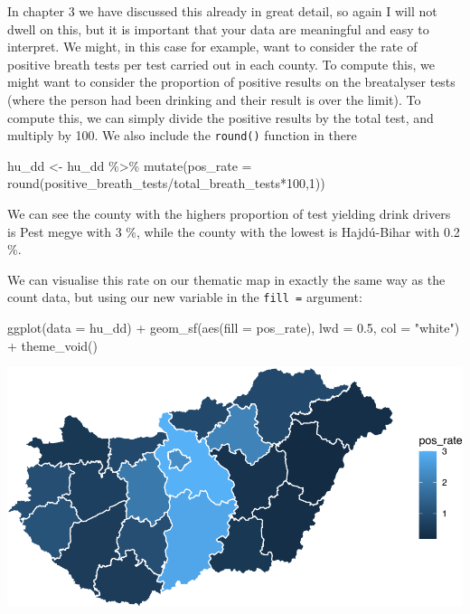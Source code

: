 \documentclass[
  krantz2]{krantz}
\makeatletter
\newenvironment{Shaded}{\begin{snugshade}}{\end{snugshade}}
\newcommand{\AttributeTok}[1]{\textcolor[rgb]{0.61,0.61,0.61}{#1}}
\newcommand{\DecValTok}[1]{\textcolor[rgb]{0.06,0.06,0.06}{#1}}
\newcommand{\FloatTok}[1]{\textcolor[rgb]{0.06,0.06,0.06}{#1}}
\newcommand{\FunctionTok}[1]{\textcolor[rgb]{0,0,0}{#1}}
\newcommand{\NormalTok}[1]{#1}
\newcommand{\OtherTok}[1]{\textcolor[rgb]{0.37,0.37,0.37}{#1}}
\newcommand{\SpecialCharTok}[1]{\textcolor[rgb]{0,0,0}{#1}}
\newcommand{\StringTok}[1]{\textcolor[rgb]{0.5,0.5,0.5}{#1}}
\newenvironment{kframe}{%
\medskip{}
\setlength{\fboxsep}{.8em}
 \def\at@end@of@kframe{}%
 \ifinner\ifhmode%
  \def\at@end@of@kframe{\end{minipage}}%
  \begin{minipage}{\columnwidth}%
 \fi\fi%
 \def\FrameCommand##1{\hskip\@totalleftmargin \hskip-\fboxsep
 \colorbox{shadecolor}{##1}\hskip-\fboxsep
     \hskip-\linewidth \hskip-\@totalleftmargin \hskip\columnwidth}%
 \MakeFramed {\advance\hsize-\width
   \@totalleftmargin\z@ \linewidth\hsize
   \@setminipage}}%
 {\par\unskip\endMakeFramed%
 \at@end@of@kframe}
\renewenvironment{Shaded}{\begin{kframe}}{\end{kframe}}
\makeatother
\begin{document}
In chapter 3 we have discussed this already in great detail, so again I will not dwell on this, but it is important that your data are meaningful and easy to interpret. We might, in this case for example, want to consider the rate of positive breath tests per test carried out in each county. To compute this, we might want to consider the proportion of positive results on the breatalyser tests (where the person had been drinking and their result is over the limit). To compute this, we can simply divide the positive results by the total test, and multiply by 100. We also include the \texttt{round()} function in there

\begin{Shaded}
\begin{Highlighting}[]
\NormalTok{hu\_dd }\OtherTok{\textless{}{-}}\NormalTok{ hu\_dd }\SpecialCharTok{\%\textgreater{}\%} 
  \FunctionTok{mutate}\NormalTok{(}\AttributeTok{pos\_rate =} \FunctionTok{round}\NormalTok{(positive\_breath\_tests}\SpecialCharTok{/}\NormalTok{total\_breath\_tests}\SpecialCharTok{*}\DecValTok{100}\NormalTok{,}\DecValTok{1}\NormalTok{))}
\end{Highlighting}
\end{Shaded}

We can see the county with the highers proportion of test yielding drink drivers is Pest megye with 3 \%, while the county with the lowest is Hajdú-Bihar with 0.2 \%.

We can visualise this rate on our thematic map in exactly the same way as the count data, but using our new variable in the \texttt{fill\ =} argument:

\begin{Shaded}
\begin{Highlighting}[]
\FunctionTok{ggplot}\NormalTok{(}\AttributeTok{data =}\NormalTok{ hu\_dd) }\SpecialCharTok{+} 
  \FunctionTok{geom\_sf}\NormalTok{(}\FunctionTok{aes}\NormalTok{(}\AttributeTok{fill =}\NormalTok{ pos\_rate), }\AttributeTok{lwd =} \FloatTok{0.5}\NormalTok{, }\AttributeTok{col =} \StringTok{"white"}\NormalTok{) }\SpecialCharTok{+} 
  \FunctionTok{theme\_void}\NormalTok{()}
\end{Highlighting}
\end{Shaded}

\includegraphics{crime_mapping_files/figure-latex/themmapratefill-1.pdf}
\end{document}
